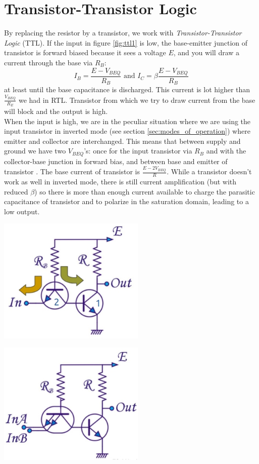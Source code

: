 \section{Transistor-Transistor Logic}
\label{sec:ttl}
By replacing the resistor by a transistor, we work with \emph{Transistor-Transistor Logic} (TTL). If the input in figure \ref{fig:ttl1} is low, the base-emitter junction of transistor  is forward biased because it sees a voltage $E$, and you will draw a current through the base via $R_B$: 
$$I_B = \frac{E - V_{BEQ}}{R_B} \text{ and } I_C = \beta \frac{E - V_{BEQ}}{R_B}$$
at least until the base capacitance is discharged. This current is lot higher than $\frac{V_{BEQ}}{R_E}$ we had in RTL. Transistor  from which we try to draw current from the base will block and the output is high.\\
When the input is high, we are in the peculiar situation where we are using the input transistor in inverted mode (see section \ref{sec:modes_of_operation}) where emitter and collector are interchanged. This means that between supply and ground we have two $V_{BEQ}$'s: once for the input transistor   via $R_B$ and with the collector-base junction in forward bias, and between base and emitter of transistor . The base current of transistor  is $\frac{E - 2V_{BEQ}}{R}$. While a transistor doesn't work as well in inverted mode, there is still current amplification (but with reduced $\beta$) so there is more than enough current available to charge the parasitic capacitance of transistor  and to polarize  in the saturation domain, leading to a low output.

\begin{minipage}{.5\textwidth}
	\centering
	\includegraphics[width=7cm]{figures/ch15/ttl1.jpg}
	\label{fig:ttl1}
\end{minipage}%
\begin{minipage}{.5\textwidth}
	\centering
	\includegraphics[width=7cm]{figures/ch15/ttl2.jpg}
	\label{fig:ttl2}
\end{minipage}

